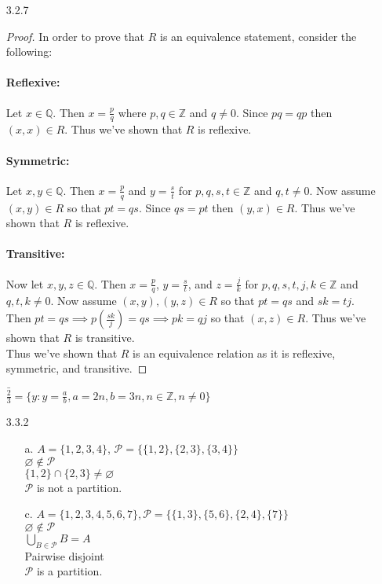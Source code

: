 \documentclass[11pt]{amsart}
\theoremstyle{definition}
\begin{document}
\begin{itemize}
\begin{itemize}
\end{itemize}

\item[3.2.7]
\begin{proof}
        In order to prove that $R$ is an equivalence statement, consider the following:
        \paragraph{Reflexive:}
            Let $x\in\mathbb{Q}$. Then $x=\frac pq$ where $p,q\in\mathbb{Z}$ and $q\ne 0$. Since $pq=qp$ then $(x,x)\in R$. Thus we've shown that $R$ is reflexive.
        \paragraph{Symmetric:}
            Let $x,y\in\mathbb{Q}$. Then $x=\frac pq$ and $y=\frac st$ for $p,q,s,t\in\mathbb{Z}$ and $q,t\ne 0$. Now assume $(x,y)\in R$ so that $pt=qs$. Since $qs=pt$ then $(y,x)\in R$. Thus we've shown that $R$ is reflexive.
        \paragraph{Transitive:}
            Now let $x,y,z\in\mathbb{Q}$. Then $x=\frac pq$, $y=\frac st$, and $z=\frac jk$ for $p,q,s,t,j,k\in\mathbb{Z}$ and $q,t,k\ne 0$. Now assume $(x,y),(y,z)\in R$ so that $pt=qs$ and $sk=tj$. Then $pt=qs\implies p(\frac{sk}j)=qs\implies pk=qj$ so that $(x,z)\in R$. Thus we've shown that $R$ is transitive. \\
        Thus we've shown that $R$ is an equivalence relation as it is reflexive, symmetric, and transitive.
    \end{proof}
    $\bar {\frac23}=\{y:y=\frac{a}{b},a=2n,b=3n,n\in\mathbb{Z},n\ne 0\}$

\item[3.3.2]
\begin{itemize}
    \item[a.] $A=\{1,2,3,4\}$, $\mathscr{P}=\{\{1,2\},\{2,3\},\{3,4\}\}$ \\
              $\varnothing\notin\mathscr{P}$ \\
              $\{1,2\}\cap\{2,3\}\ne \varnothing$ \\
              $\mathscr{P}$ is not a partition.

    \item[c.] $A=\{1,2,3,4,5,6,7\},\mathscr{P}=\{\{1,3\},\{5,6\},\{2,4\},\{7\}\}$ \\
              $\varnothing\notin\mathscr{P}$ \\
              $\bigcup_{B\in\mathscr{P}}B=A$ \\
              Pairwise disjoint \\
              $\mathscr{P}$ is a partition.


\end{itemize}
\end{itemize}
\end{document}
